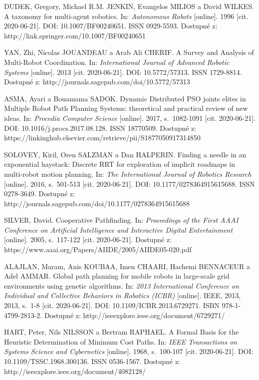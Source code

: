 \begin{thebibliography}{99}
DUDEK, Gregory, Michael R.M. JENKIN, Evangelos MILIOS a David WILKES. A taxonomy for multi-agent robotics. In: \textit{Autonomous Robots} [online]. 1996 [cit. 2020-06-21]. DOI: 10.1007/BF00240651. ISSN 0929-5593. Dostupné z: http://link.springer.com/10.1007/BF00240651

YAN, Zhi, Nicolas JOUANDEAU a Arab Ali CHERIF. A Survey and Analysis of Multi-Robot Coordination. In: \textit{International Journal of Advanced Robotic Systems} [online]. 2013 [cit. 2020-06-21]. DOI: 10.5772/57313. ISSN 1729-8814. Dostupné z: http://journals.sagepub.com/doi/10.5772/57313

ASMA, Ayari a Bouamama SADOK. Dynamic Distributed PSO joints elites in Multiple Robot Path Planning Systems: theoretical and practical review of new ideas. In: \textit{Procedia Computer Science} [online]. 2017, s.~1082-1091 [cit. 2020-06-21]. DOI: 10.1016/j.procs.2017.08.128. ISSN 18770509. Dostupné z: https://linkinghub.elsevier.com/retrieve/pii/S1877050917314850

SOLOVEY, Kiril, Oren SALZMAN a Dan HALPERIN. Finding a needle in an exponential haystack: Discrete RRT for exploration of implicit roadmaps in multi-robot motion planning. In: \textit{The International Journal of Robotics Research} [online]. 2016, s.~501-513 [cit. 2020-06-21]. DOI: 10.1177/0278364915615688. ISSN 0278-3649. Dostupné z: http://journals.sagepub.com/doi/10.1177/0278364915615688

SILVER, David. Cooperative Pathfinding. In: \textit{Proceedings of the First AAAI Conference on Artificial Intelligence and Interactive Digital Entertainment} [online]. 2005, s.~117-122 [cit. 2020-06-21]. Dostupné z: https://www.aaai.org/Papers/AIIDE/2005/AIIDE05-020.pdf

ALAJLAN, Maram, Anis KOUBAA, Imen CHAARI, Hachemi BENNACEUR a Adel AMMAR. Global path planning for mobile robots in large-scale grid environments using genetic algorithms. In: \textit{2013 International Conference on Individual and Collective Behaviors in Robotics (ICBR)} [online]. IEEE, 2013, 2013, s.~1-8 [cit. 2020-06-21]. DOI: 10.1109/ICBR.2013.6729271. ISBN 978-1-4799-2813-2. Dostupné z: http://ieeexplore.ieee.org/document/6729271/

HART, Peter, Nils NILSSON a Bertram RAPHAEL. A Formal Basis for the Heuristic Determination of Minimum Cost Paths. In: \textit{IEEE Transactions on Systems Science and Cybernetics} [online]. 1968, s.~100-107 [cit. 2020-06-21]. DOI: 10.1109/TSSC.1968.300136. ISSN 0536-1567. Dostupné z: http://ieeexplore.ieee.org/document/4082128/


\end{thebibliography}

